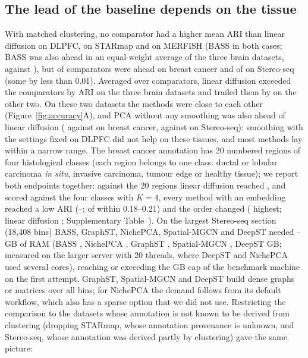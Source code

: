 \documentclass[unnumsec,webpdf,contemporary,large]{oup-authoring-template}
\newcommand{\figref}[1]{Figure~\ref{#1}}
\begin{document}
\subsection{The lead of the baseline depends on the tissue}
With matched clustering, no comparator had a higher mean ARI than linear
diffusion on DLPFC, \nAheadStarmap{} on STARmap and \nAheadMerfish{} on MERFISH (BASS in both cases; BASS was also ahead in an
equal-weight average of the three brain datasets, \overallBass{} against \overallLin), but \nAheadBrca{} of \nCmpBrca{} comparators were ahead on breast
cancer and \nAheadStereo{} of \nCmpStereo{} on Stereo-seq (some by less than 0.01). Averaged over comparators, linear diffusion exceeded the
comparators by \dBrain{} ARI on the three brain datasets and trailed them by \dOtherAbs{} on the other two. On these two datasets the methods were close to each
other (\figref{fig:accuracy}A), and PCA without any smoothing was also ahead of linear diffusion (\meanPcaBrca{} against
\meanLinBrca{} on breast cancer, \meanPcaStereo{} against \meanLinStereo{} on Stereo-seq): smoothing with the settings fixed on
DLPFC did not help on these tissues, and most methods lay within a narrow range. The breast cancer annotation has 20 numbered regions of four histological classes (each region belongs to one class: ductal or
lobular carcinoma \emph{in situ}, invasive carcinoma, tumour edge or healthy tissue); we report both endpoints together: against the 20
regions linear diffusion reached \meanLinBrca, and scored against the four classes with $K=4$, every method with an embedding reached a low ARI (\brcaCoarseLo--\brcaCoarseHi; \brcaCoarseNear{} of \brcaCoarseN{} within 0.18--0.21) and the order changed (\brcaCoarseTop{} highest;
linear diffusion \brcaCoarseLin; Supplementary Table~\STbrca). On the largest Stereo-seq section (18,408 bins) BASS, GraphST,
NichePCA, Spatial-MGCN and DeepST needed \peakBigMin--\peakBigMax{} GB of RAM (BASS \peakBigBass, NichePCA \peakBigNichepca, GraphST
\peakBigGraphst, Spatial-MGCN \peakBigMgcn, DeepST \peakBigDeepst{} GB; measured on the larger server with 20 threads, where DeepST and NichePCA used several cores), reaching or exceeding the \memCap{} GB cap of the benchmark machine on the first attempt. GraphST, Spatial-MGCN and DeepST build dense graphs or matrices over all bins; for NichePCA the demand follows from its default workflow, which also has a sparse option that we did not use. Restricting the comparison to the datasets whose annotation is not known to be derived from clustering (dropping STARmap,
whose annotation provenance is unknown, and Stereo-seq, whose annotation was derived partly by clustering) gave the same picture:
\end{document}
